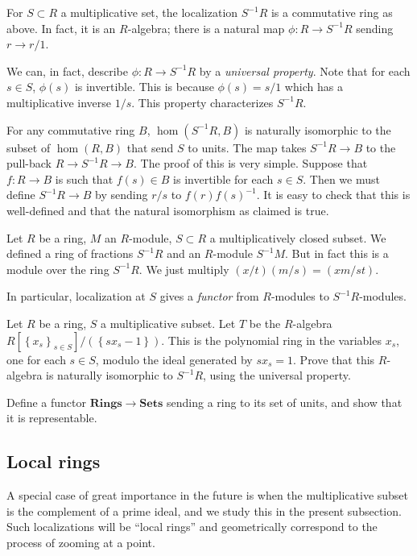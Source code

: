 \begin{definition}
For $S \subset R$ a multiplicative set, the localization $S^{-1}R$ is a
commutative ring as above. In fact, it is an $R$-algebra; there is a natural
map $\phi: R \to S^{-1}R$ sending $r \to r/1$.
\end{definition} 

We can, in fact, describe $\phi: R \to S^{-1}R$ by a \emph{universal property}. Note
that for each $s \in S$, $\phi(s)$ is invertible.  This is because $\phi(s) =
s/1$ which has a multiplicative inverse $1/s$.  This property characterizes
$S^{-1}R$.  

For any commutative ring $B$, $\hom(S^{-1}R, B)$ is naturally isomorphic to the
subset of $\hom(R,B)$ that send $S$ to units.  The map takes $S^{-1}R \to B$ to
the pull-back $R \to S^{-1}R \to B$.  The proof of this is very simple.
Suppose that $f: R \to B$ is such that $f(s) \in B$ is invertible for each $s
\in S$.  Then we must define $S^{-1}R \to B$ by sending $r/s$ to
$f(r)f(s)^{-1}$.  It is easy to check that this is well-defined and that the
natural isomorphism as claimed is true.

Let $R$ be a ring, $M$ an $R$-module, $S \subset R$ a multiplicatively closed
subset. We defined a ring of fractions $S^{-1}R$ and an $R$-module $S^{-1}M$.
But in fact this is a module over the ring $S^{-1}R$.
We just multiply $(x/t)(m/s) = (xm/st)$.

In particular, localization at $S$ gives a \emph{functor} from $R$-modules to
$S^{-1}R$-modules.

\begin{exercise} 
Let $R$ be a ring, $S$ a multiplicative subset. Let $T$ be the $R$-algebra
$R[\left\{x_s\right\}_{s \in S}]/( \left\{sx_s - 1\right\})$. This is the
polynomial ring in the variables $x_s$, one for each $s \in S$, modulo the
ideal generated by $sx_s  = 1$. Prove that this $R$-algebra is naturally
isomorphic to $S^{-1}R$, using the universal property.
\end{exercise} 

\begin{exercise} Define a functor $\mathbf{Rings} \to \mathbf{Sets}$ sending a ring to
its set of units, and show that it is representable. 
\end{exercise} 
\subsection{Local rings}

A special case of great importance in the future is when the multiplicative
subset is the complement of a prime ideal, and we study this in the present
subsection. Such localizations will be ``local rings'' and geometrically
correspond to the process of zooming at a point.

